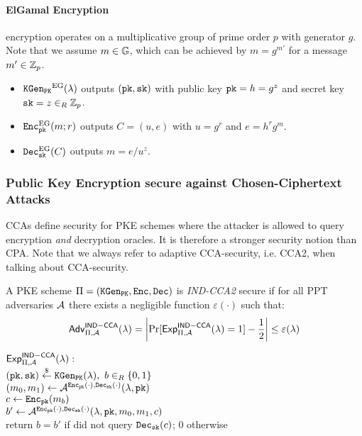 \paragraph{ElGamal Encryption}\label{sec:elgamalencryption}
\citet{Gamal84} encryption operates on a multiplicative group \GG of prime order $p$ with generator $g$.
Note that we assume $m\in\mathbb{G}$, which can be achieved by $m=g^{m'}$ for a message $m'\in\mathbb{Z}_p$.
\begin{itemize}
  \item $\mathtt{KGen_{PK}}^\mathrm{EG}(\lambda)$ outputs $(\mathtt{pk}, \mathtt{sk})$ with public key $\mathtt{pk}=h=g^z$ and secret key $\mathtt{sk}=z\in_R\mathbb{Z}_p$.
  \item $\mathtt{Enc}^{\mathrm{EG}}_\mathtt{pk}(m;r)$ outputs $C=(u,e)$ with $u=g^r$ and $e=h^rg^m$.
  \item $\mathtt{Dec}_\mathtt{sk}^\mathrm{EG}(C)$ outputs $m=e/u^z$.
\end{itemize}


\subsubsection[Chosen-Ciphertext Attacks]{Public Key Encryption secure against Chosen-Ciphertext Attacks}
\acp{CCA} define security for \ac{PKE} schemes where the attacker is allowed to query encryption \emph{and} decryption oracles.
It is therefore a stronger security notion than \ac{CPA}.
Note that we always refer to adaptive \ac{CCA}-security, i.e. \ac{CCA}2, when talking about \ac{CCA}-security.

\begin{definition}\label{def:indcca2}
A \ac{PKE} scheme $\Pi=(\mathtt{KGen_{PK}},\mathtt{Enc},\mathtt{Dec})$ is \emph{IND-CCA2} secure if for all \ac{PPT} adversaries $\mathcal{A}$ there exists a negligible function $\varepsilon(\cdot)$ such that:
\[\mathsf{Adv}_{\Pi,\mathcal{A}}^{\mathsf{IND-CCA}}(\lambda)=\left|\Pr[\mathsf{Exp}^{\mathsf{IND-CCA}}_{\Pi,\mathcal{A}}(\lambda)=1]-\frac12\right|\leq\varepsilon(\lambda)\]

\noindent
$\mathsf{Exp}^{\mathsf{IND-CCA}}_{\Pi,\mathcal{A}}(\lambda):$\\
\hspace*{2em}$(\mathtt{pk},\mathtt{sk})\stackrel{\$}{\gets}\mathtt{KGen_{PK}}(\lambda),~b\in_R\{0,1\}$\\
\hspace*{2em}$(m_0,m_1)\gets\mathcal{A}^{\mathtt{Enc}_\mathtt{pk}(\cdot),\mathtt{Dec}_\mathtt{sk}(\cdot)}(\lambda,\mathtt{pk})$\\
\hspace*{2em}$c\gets\mathtt{Enc}_\mathtt{pk}(m_b)$\\
\hspace*{2em}$b'\gets\mathcal{A}^{\mathtt{Enc}_\mathtt{pk}(\cdot),\mathtt{Dec}_\mathtt{sk}(\cdot)}(\lambda,\mathtt{pk},m_0,m_1,c)$\\
\hspace*{2em}return $b=b'$ if \cA did not query $\mathtt{Dec}_\mathtt{sk}(c)$; $0$ otherwise
\eod
\end{definition}

